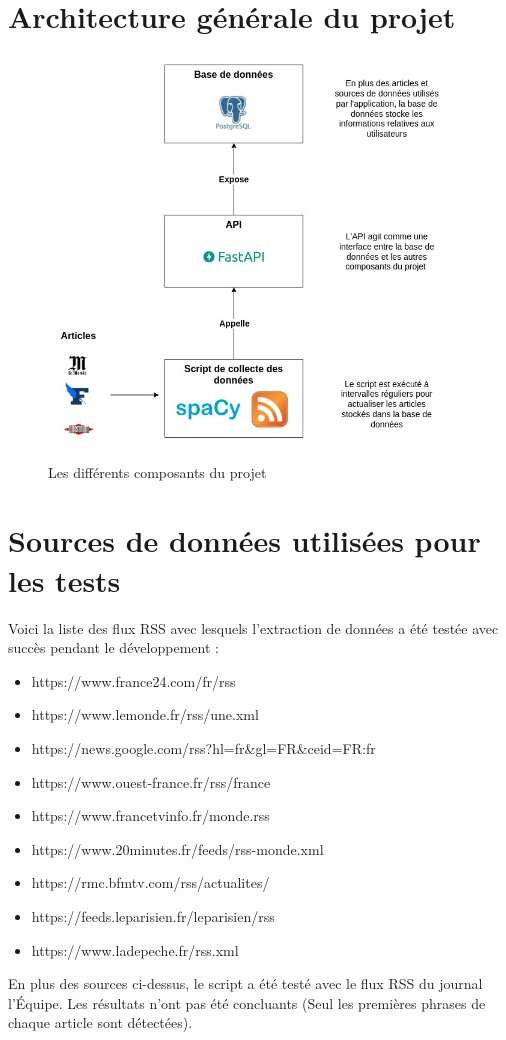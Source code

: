 \documentclass[french]{article}
\begin{document}
    \section*{Architecture générale du projet}
    \begin{figure}[h!]
        \includegraphics[width=12cm]{composants}
        \centering
        \caption{Les différents composants du projet}
        \centering
    \end{figure}
    \section*{Sources de données utilisées pour les tests}
    Voici la liste des flux RSS avec lesquels l'extraction de données a été testée avec succès pendant le développement :
    \begin{itemize}
        \item https://www.france24.com/fr/rss
        \item https://www.lemonde.fr/rss/une.xml
        \item https://news.google.com/rss?hl=fr\&gl=FR\&ceid=FR:fr
        \item https://www.ouest-france.fr/rss/france
        \item https://www.francetvinfo.fr/monde.rss
        \item https://www.20minutes.fr/feeds/rss-monde.xml
        \item https://rmc.bfmtv.com/rss/actualites/
        \item https://feeds.leparisien.fr/leparisien/rss
        \item https://www.ladepeche.fr/rss.xml
    \end{itemize}
    En plus des sources ci-dessus, le script a été testé avec le flux RSS du journal l'Équipe. Les résultats n'ont pas été concluants (Seul les premières phrases de chaque article sont détectées).
    
\end{document}
